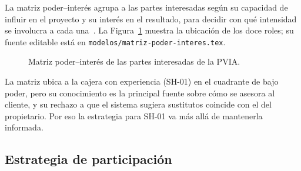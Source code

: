 La matriz poder--interés agrupa a las partes interesadas según su capacidad de influir en el proyecto y su interés en el resultado, para decidir con qué intensidad se involucra a cada una~\cite{pmbok2021}. La Figura~\ref{fig:matriz} muestra la ubicación de los doce roles; su fuente editable está en \texttt{modelos/matriz-poder-interes.tex}.

\begin{figure}[H]
\centering

\caption{Matriz poder--interés de las partes interesadas de la PVIA.}
\label{fig:matriz}
\end{figure}

La matriz ubica a la cajera con experiencia (SH-01) en el cuadrante de bajo poder, pero su conocimiento es la principal fuente sobre cómo se asesora al cliente, y su rechazo a que el sistema sugiera sustitutos coincide con el del propietario. Por eso la estrategia para SH-01 va más allá de mantenerla informada.

\subsection{Estrategia de participación}

